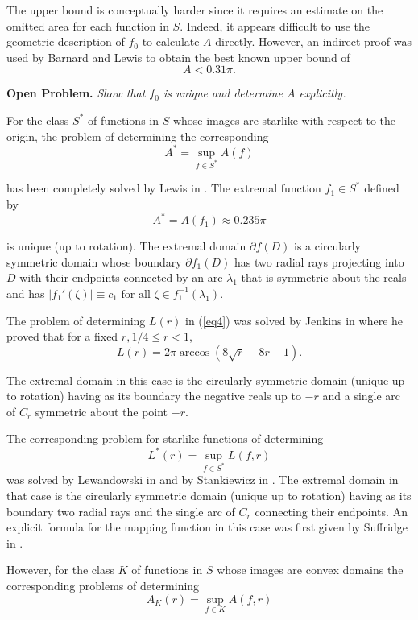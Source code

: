 \documentclass[final]{siamltex}
\begin{document}
The upper bound is conceptually harder since it requires an estimate on the omitted area for each function in $S$.  Indeed, it appears
difficult to use the geometric description of $f_0$ to calculate $A$ directly.  However, an indirect proof was used by Barnard and Lewis
\cite{BarnardLewis2} to obtain the best known upper bound of 
$$A < 0.31\pi.$$

{\bf Open Problem.}  {\em Show that $f_0$ is unique and determine $A$ explicitly.}

\vspace{0.1in}

For the class $S^*$ of functions in $S$ whose images are starlike with respect to the origin, the problem of determining
the corresponding
$$A^* = \sup_{f \in S^*} A(f)$$

\noindent has been completely solved by Lewis in \cite{Lewis1}.  The extremal function $f_1 \in S^*$ defined by 
$$A^* = A(f_1) \approx 0.235 \pi$$

\noindent is unique (up to rotation).  The extremal domain $\partial f(D)$ is a circularly symmetric domain whose boundary $\partial f_1(D)$ has two radial rays projecting into $D$ with their endpoints connected by an arc $\lambda_1$ that is symmetric about the reals and has $|f_1'(\zeta)| \equiv c_1 \mbox{ for all } \zeta \in f_1^{-1}(\lambda_1)$.

The problem of determining $L(r)$ in (\ref{eq4}) was solved by Jenkins in \cite{Jenkins1} where he proved that for a fixed 
$r, 1/4 \leq r < 1$,
$$L(r) = 2\pi \arccos (8 \sqrt{r} - 8r -1).$$

\noindent The extremal domain in this case is the circularly symmetric domain (unique up to rotation) having as its boundary the negative 
reals up to $-r$ and a single arc of $C_r$ symmetric about the point $-r$.

The corresponding problem for starlike functions of determining 
$$L^*(r) = \sup_{f \in S^*} L(f,r)$$ 
was solved by Lewandowski in \cite{Lewandowski1} and by Stankiewicz in \cite{Stankiewicz1}.  
The extremal domain in that case is the circularly symmetric domain (unique up to rotation) having as its 
boundary two radial rays and the single arc of $C_r$ connecting their endpoints.  An explicit
formula for the mapping function in this case was first given by Suffridge in \cite{Suffridge1}.

However, for the class $K$ of functions in $S$ whose images are convex domains the corresponding problems of determining
\begin{equation*}
A_K(r) = \sup_{f \in K} A(f,r) 
\end{equation*}
\end{document}
